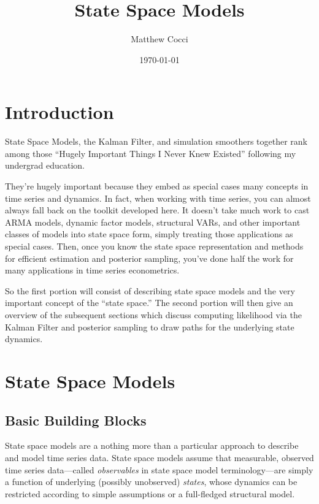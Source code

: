 \documentclass[a4paper,12pt]{article}
\author{Matthew Cocci}
\title{State Space Models} \date{\today}
\begin{document}
\maketitle

\tableofcontents %

\clearpage
\section{Introduction}

State Space Models, the Kalman Filter, and simulation smoothers together
rank among those ``Hugely Important Things I Never Knew Existed''
following my undergrad education. 

They're hugely important because they embed as special cases many
concepts in time series and dynamics.  In fact, when working with time
series, you can almost always fall back on the toolkit developed here.
It doesn't take much work to cast ARMA models, dynamic factor models,
structural VARs, and other important classes of models into state space
form, simply treating those applications as special cases.  Then, once
you know the state space representation and methods for efficient
estimation and posterior sampling, you've done half the work for many
applications in time series econometrics.

So the first portion will consist of describing state space models and
the very important concept of the ``state space.'' The second portion
will then give an overview of the subsequent sections which discuss
computing likelihood via the Kalman Filter and posterior sampling to
draw paths for the underlying state dynamics.

\section{State Space Models}

\subsection{Basic Building Blocks}

State space models are a nothing more than a particular approach to
describe and model time series data. State space models assume
that measurable, observed time series data---called \emph{observables} in
state space model terminology---are simply a function of underlying
(possibly unobserved) \emph{states}, whose dynamics can be restricted
according to simple assumptions or a full-fledged structural model.
\end{document}
